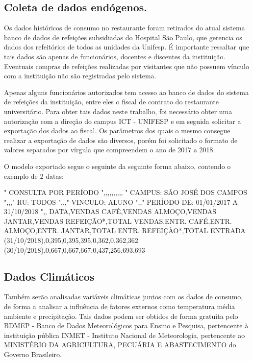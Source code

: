 \documentclass[	12pt, Times, openright, twoside, a4paper, english, brazil]{abntex2}
\begin{document}
	    \subsection{Coleta de dados endógenos.}
        	Os dados históricos de consumo no restaurante foram retirados do atual sistema banco de dados de refeições subsidiadas do Hospital São Paulo, que gerencia os dados dos refeitórios de todos as unidades da Unifesp. É importante ressaltar que tais dados são apenas de funcionários, docentes e discentes da instituição. Eventuais compras de refeições realizadas por visitantes que não possuem vínculo com a instituição não são registradas pelo sistema. 
        	
        	Apenas alguns funcionários autorizados tem acesso ao banco de dados do sistema de refeições da instituição, entre eles o fiscal de contrato do restaurante universitário. Para obter tais dados neste trabalho, foi necessário obter uma autorização com a direção do campus ICT - UNIFESP e em seguida solicitar a exportação dos dados ao fiscal. Os parâmetros dos quais o mesmo consegue realizar a exportação de dados são diversos, porém foi solicitado o formato de valores separados por vírgula que compreendem o ano de 2017 a 2018.
    
        	O modelo exportado segue o seguinte da seguinte forma abaixo, contendo o exemplo de 2 datas: \\
        	\begin{algorithm}[H]
        		"
        		CONSULTA POR PERÍODO                    ",,,,,,,,,,
        		"
        		CAMPUS: SÃO JOSÉ DOS CAMPOS                    ",,,"
        		RU: TODOS                    ",,,"
        		VINCULO: ALUNO                    ",,"
        		PERÍODO DE: 01/01/2017 A 31/10/2018                        ",,
        		DATA,VENDAS CAFÉ,VENDAS ALMOÇO,VENDAS JANTAR,VENDAS REFEIÇÃO*,TOTAL VENDAS,ENTR. CAFÉ,ENTR. ALMOÇO,ENTR. JANTAR,TOTAL ENTR. REFEIÇÃO*,TOTAL ENTRADA
        		(31/10/2018),0,395,0,395,395,0,362,0,362,362
        		(30/10/2018),0,667,0,667,667,0,437,256,693,693
        	\end{algorithm}
        
        \subsection{Dados Climáticos}
        	Também serão analisadas variáveis climáticas juntos com os dados de consumo, de forma a analisar a influência de fatores externos como temperatura média ambiente e precipitação. Tais dados podem ser obtidos de forma gratuita pelo BDMEP - Banco de Dados Meteorológicos para Ensino e Pesquisa, pertencente à instituição pública INMET - Instituto Nacional de Meteorologia, pertencente ao MINISTÉRIO DA AGRICULTURA, PECUÁRIA E ABASTECIMENTO do Governo Brasileiro. 
        	
\end{document}
